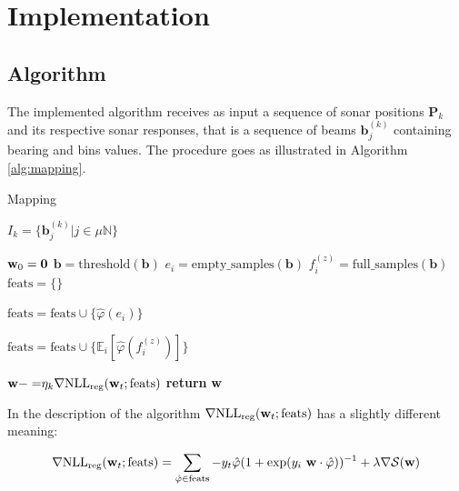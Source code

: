 \section{Implementation}
\subsection{Algorithm}

The implemented algorithm receives as input a sequence of sonar positions
$\mathbf{P}_k$ and its respective sonar responses, that is a sequence of beams
$\mathbf{b}_j^{(k)}$ containing bearing and bins values. The procedure goes
as illustrated in Algorithm \ref{alg:mapping}.


\begin{algorithm}
\caption{Mapping}
\label{alg:mapping}
\begin{algorithmic}

\State $I_k = \{\mathbf{b}_j^{(k)}|j\in \mu\mathbb{N}\}$

\State $\mathrm{\mathbf{w}}_0 = \mathbf{0}$
\State $\mathbf{b} = \mathrm{threshold}(\mathbf{b})$
\State $e_i = \mathrm{empty\_samples}(\mathbf{b})$
\State $f_i^{(z)} = \mathrm{full\_samples}(\mathbf{b})$
\State $\text{feats}=\{\}$

\State $\text{feats}=\text{feats}\cup\{\hat\varphi(e_i)\}$
\EndFor

\State
$\text{feats}=\text{feats}\cup\{\mathbb{E}_i[{
\hat\varphi(f_i^{(z)})}]\}$
\EndFor
\EndFor

\State $\mathrm{\mathbf{w}} {-=}
\eta_k\nabla\text{NLL}_{\text{reg}}(\mathrm{\mathbf{w}}_t;\text{feats})$ 
\EndFor
\State \textbf{return} $\mathrm{\mathbf{w}}$
\EndProcedure
\end{algorithmic}
\end{algorithm}

In the description of the algorithm
$\nabla\text{NLL}_{\text{reg}}(\mathrm{\mathbf{w}}_t;\text{feats})$ has a slightly
different meaning:

\begin{equation*}
\nabla\text{NLL}_{\text{reg}}(\mathrm{\mathbf{w}}_t;\text{feats}) =
\sum_{\hat{\mathbf{\varphi}}\in \text{feats}}
-y_t\hat{\mathbf{\varphi}}(1+\exp(y_i~
\mathrm{\mathbf{w}}\cdot\hat{\mathbf{\varphi}}))^{-1} +\lambda\nabla\mathcal{S}(\mathrm{\mathbf{w}})
\end{equation*}

